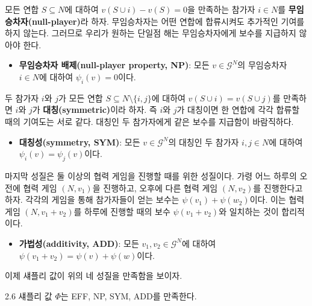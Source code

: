 \documentclass{article}
\numberwithin{equation}{section}
\begin{document}
모든 연합 $S\subseteq N$에 대하여 $v(S\cup i)-v(S)=0$을 만족하는 참가자 $i\in N$를 \textbf{무임승차자(null-player)}라 하자. 무임승차자는 어떤 연합에 합류시켜도 추가적인 기여를 하지 않는다. 그러므로 우리가 원하는 단일점 해는 무임승차자에게 보수를 지급하지 않아야 한다.
\begin{itemize}
	\item \textbf{무임승차자 배제(null-player property, NP)}: 모든 $v\in\mathcal G^N$의 무임승차자 $i\in N$에 대하여 $\psi_i(v)=0$이다.
\end{itemize}

두 참가자 $i$와 $j$가 모든 연합 $S\subseteq N\setminus\{i,j\}$에 대하여 $v(S\cup i)=v(S\cup j)$를 만족하면 $i$와 $j$가 \textbf{대칭(symmetric)}이라 하자. 즉 $i$와 $j$가 대칭이면 한 연합에 각각 합류할 때의 기여도는 서로 같다. 대칭인 두 참가자에게 같은 보수를 지급함이 바람직하다.
\begin{itemize}
	\item \textbf{대칭성(symmetry, SYM)}: 모든 $v\in\mathcal G^N$의 대칭인 두 참가자 $i,j\in N$에 대하여 $\psi_i(v)=\psi_j(v)$이다.
\end{itemize}

마지막 성질은 둘 이상의 협력 게임을 진행할 때를 위한 성질이다. 가령 어느 하루의 오전에 협력 게임 $(N,v_1)$을 진행하고, 오후에 다른 협력 게임 $(N,v_2)$를 진행한다고 하자. 각각의 게임을 통해 참가자들이 얻는 보수는 $\psi(v_1)+\psi(w_2)$이다. 이는 협력 게임 $(N,v_1+v_2)$를 하루에 진행할 때의 보수 $\psi(v_1+v_2)$와 일치하는 것이 합리적이다.
\begin{itemize}
	\item \textbf{가법성(additivity, ADD)}: 모든 $v_1,v_2\in\mathcal G^N$에 대하여 $\psi(v_1+v_2)=\psi(v)+\psi(w)$이다.
\end{itemize}

이제 섀플리 값이 위의 네 성질을 만족함을 보이자.

\begin{thm}{}{2.6}
	섀플리 값 $\Phi$는 EFF, NP, SYM, ADD를 만족한다.
\end{thm}
\end{document}
